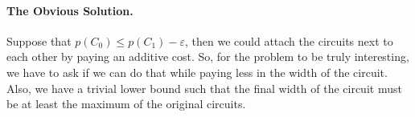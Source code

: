 
\paragraph{The Obvious Solution.} Suppose that $p(C_{0}) \leq p(C_{1}) - \varepsilon$, then we could attach the circuits next to each other by paying an additive cost. So, for the problem to be truly interesting, we have to ask if we can do that while paying less in the width of the circuit. Also, we have a trivial lower bound such that the final width of the circuit must be at least the maximum of the original circuits.
